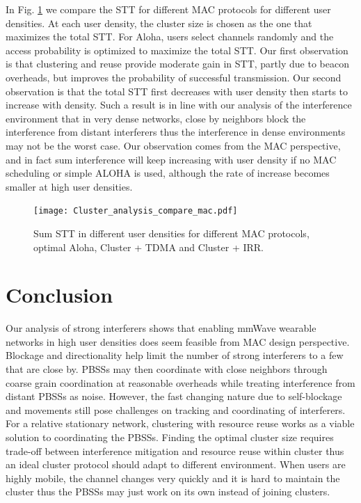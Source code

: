 \documentclass[10pt, conference, letterpaper]{IEEEtran}
\begin{document}
In Fig. \ref{fig:clusteranalysis:compare_mac} we compare the STT for different MAC protocols for different user densities. 
At each user density, the cluster size is chosen as the one that maximizes the total STT. 
For Aloha, users select channels randomly and the access probability is optimized to maximize the total STT. 
Our first observation is that clustering and reuse provide moderate gain in STT, partly due to beacon overheads, but improves the probability of successful transmission. 
Our second observation is that the total STT first decreases with user density then starts to increase with density. 
Such a result is in line with our analysis of the interference environment that in very dense networks, close by neighbors block the interference from distant interferers thus the interference in dense environments may not be the worst case. 
Our observation comes from the MAC perspective, and in fact sum interference will keep increasing with user density if no MAC scheduling or simple ALOHA is used, although the rate of increase becomes smaller at high user densities. 

\begin{figure}
	\centering
	\texttt{[image: Cluster\_analysis\_compare\_mac.pdf]}
	\caption{Sum STT in different user densities for different MAC protocols, optimal Aloha, Cluster + TDMA and Cluster + IRR.}
	\label{fig:clusteranalysis:compare_mac}
\end{figure}


\section{Conclusion}\label{section:conclusion}
Our analysis of strong interferers shows that enabling mmWave wearable networks in high user densities does seem feasible from MAC design perspective. 
Blockage and directionality help limit the number of strong interferers to a few that are close by. 
PBSSs may then coordinate with close neighbors through coarse grain coordination at reasonable overheads while treating interference from distant PBSSs as 
noise. 
However, the fast changing nature due to self-blockage and movements still pose challenges on tracking and coordinating of interferers. 
For a relative stationary network, clustering with resource reuse works as a viable solution to coordinating the PBSSs. 
Finding the optimal cluster size requires trade-off between interference mitigation and resource reuse within cluster thus an ideal cluster protocol should adapt to different environment. 
When users are highly mobile, the channel changes very quickly and it is hard to maintain the cluster thus the PBSSs may just work on its own instead of joining clusters. 
\end{document}
